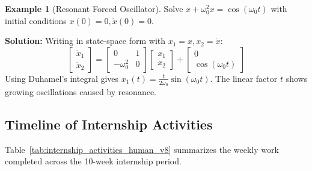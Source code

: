 \documentclass[12pt,a4paper,oneside]{article}
\theoremstyle{definition}
\newtheorem{example}{Example}[section]
\theoremstyle{plain}
\begin{document}
\begin{example}[Resonant Forced Oscillator]
Solve $\ddot{x} + \omega_0^2 x = \cos(\omega_0 t)$ with initial conditions $x(0) = 0, \dot{x}(0) = 0$.

\textbf{Solution:}
Writing in state-space form with $x_1 = x, x_2 = \dot{x}$:
\begin{equation}
    \begin{bmatrix} \dot{x}_1 \\ \dot{x}_2 \end{bmatrix} = \begin{bmatrix} 0 & 1 \\ -\omega_0^2 & 0 \end{bmatrix} \begin{bmatrix} x_1 \\ x_2 \end{bmatrix} + \begin{bmatrix} 0 \\ \cos(\omega_0 t) \end{bmatrix}
\end{equation}
Using Duhamel's integral gives $x_1(t) = \frac{t}{2\omega_0} \sin(\omega_0 t)$. The linear factor $t$ shows growing oscillations caused by resonance.
\end{example}

\subsection{Timeline of Internship Activities}

Table~\ref{tab:internship_activities_human_v8} summarizes the weekly work completed across the 10-week internship period.
\end{document}
